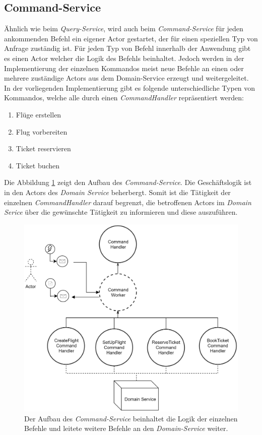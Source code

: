 \subsection{Command-Service}
\label{subsec:implementation:commandService}
 Ähnlich wie beim \textit{Query-Service}, wird auch beim \textit{Command-Service} für jeden ankommenden Befehl ein eigener Actor gestartet, der für einen speziellen Typ von Anfrage zuständig ist. Für jeden Typ von Befehl innerhalb der Anwendung gibt es einen Actor welcher die Logik des Befehls beinhaltet. Jedoch werden in der Implementierung der einzelnen Kommandos meist neue Befehle an einen oder mehrere zuständige Actors aus dem Domain-Service erzeugt und weitergeleitet. \\
 In der vorliegenden Implementierung gibt es folgende unterschiedliche Typen von Kommandos, welche alle durch einen \textit{CommandHandler} repräsentiert werden:
 \begin{enumerate}
   \item Flüge erstellen
   \item Flug vorbereiten
   \item Ticket reservieren
   \item Ticket buchen
 \end{enumerate}
Die Abbildung \ref{fig:implementation:commandActorModel} zeigt den Aufbau des \textit{Command-Service}. Die Geschäftslogik ist in den Actors des \textit{Domain Service} beherbergt. Somit ist die Tätigkeit der einzelnen \textit{CommandHandler} darauf begrenzt, die betroffenen Actors im \textit{Domain Serice} über die gewünschte Tätigkeit zu informieren und diese auszuführen. 
 \begin{figure}
  \centering
  \includegraphics[width=0.8\linewidth]{gfx/implementation/CommandServiceActorModel}
  \caption{Der Aufbau des \textit{Command-Service} beinhaltet die Logik der einzelnen Befehle und leitete weitere Befehle an den \textit{Domain-Service} weiter.}
  \label{fig:implementation:commandActorModel}
\end{figure} 

